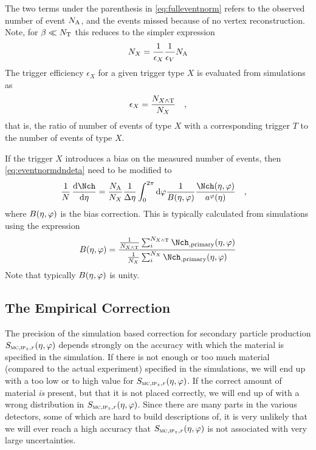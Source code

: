 \documentclass[compat,11pt]{alicenote}
\newcommand\mult[1][]{\Nch\ifx|#1|\relax\else_{#1}\fi}
\newcommand*{\etaphi}{\ensuremath(\eta,\varphi)}
\newcommand{\N}[2]{{\ensuremath N_{#1#2}}}
\newcommand*{\NT}{\N{\text{T}}{}}
\renewcommand{\NA}{\N{\text{A}}{}}
\newcommand*\SecMap{\ensuremath S_{\subMC,\subIPz,r}\etaphi}
\newcommand{\dndetadphi}[1][]{{\ensuremath%
    \ifx|#1|\else\left.\fi%
      \Nch\etaphi%
      \ifx|#1|\else\right|_{#1}\fi}}
\newcommand{\PhiAcc}{\ensuremath a^{\varphi}(\eta)}
\begin{document}
The two terms under the parenthesis in \eqref{eq:fulleventnorm} refers
to the observed number of event $\NA$, and the events missed because
of no vertex reconstruction.  Note, for $\beta\ll\NT{}$
this reduces to the simpler expression
$$
\N{X}{} = \frac1{\epsilon_X}\frac1{\epsilon_V}\NA{}
$$
The trigger efficiency $\epsilon_X$ for a given trigger type $X$ is
evaluated from simulations as
\begin{align*}
  \epsilon_X = \frac{\N{X\wedge \text{T}}{}}{\N{X}{}}\quad,
\end{align*}
that is, the ratio of number of events of type $X$ with a
corresponding trigger $T$ to the number of events of type $X$.

If the trigger $X$ introduces a bias on the measured number of events,
then \eqref{eq:eventnormdndeta} need to be modified to 
\begin{align}
  \ndndeta &= 
  \frac{\NA}{\N{X}{}}\frac1{\Delta\eta} \int_0^{2\pi} \text{d}\varphi
  \frac{1}{B\etaphi}\frac{\dndetadphi}{\PhiAcc}
  \label{eq:eventnormdndeta2}\quad,
\end{align}
where $B\etaphi$ is the bias correction.  This is typically
calculated from simulations using the expression 
\begin{align*}
  B\etaphi = \frac{\frac{1}{\N{X\wedge \text{T}}{}}\sum_i^{\N{X\wedge
        \text{T}}{}}
    \mult[,\text{primary}]\etaphi}{\frac{1}{\N{X}{}}\sum_i^{\N{X}{}}
    \mult[,\text{primary}]\etaphi}
\end{align*}
Note that typically $B\etaphi$ is unity.

\subsection{The Empirical Correction} 
\label{sec:sub:empirical} 

The precision of the simulation based correction for secondary
particle production $\SecMap{}$ depends strongly on the accuracy with
which the material is specified in the simulation.  If there is not
enough or too much material (compared to the actual experiment)
specified in the simulations, we will end up with a too low or to high
value for $\SecMap$.  If the correct amount of material \emph{is}
present, but that it is not placed correctly, we will end up of with a
wrong distribution in $\SecMap$.   Since there are many parts in
the various detectors, some of which are hard to build descriptions
of, it is very unlikely that we will ever reach a high accuracy that
$\SecMap$ is not associated with very large uncertainties. 
\end{document}
